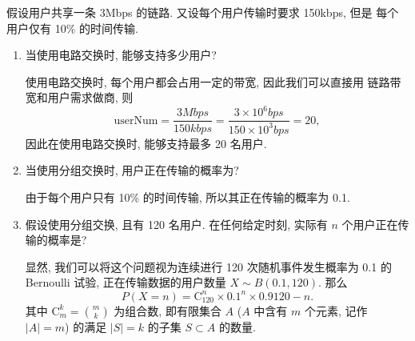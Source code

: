 \documentclass[10pt,UTF8]{ctexbook} %
\begin{document}
\begin{example}
    假设用户共享一条 3Mbps 的链路. 又设每个用户传输时要求 150kbps, 但是
    每个用户仅有 10\% 的时间传输.
    \begin{enumerate}[label={$\left.\mathrm{\alph*}\right)$}, itemsep=0pt]
        \item 当使用电路交换时, 能够支持多少用户?
        \begin{sol}
            使用电路交换时, 每个用户都会占用一定的带宽, 因此我们可以直接用
            链路带宽和用户需求做商, 则
            \[ \mathrm{userNum} = \dfrac{3 \si{Mbps}}{150 \si{kbps}}
            = \dfrac{3 \times 10^6 \si{bps}}{150 \times 10^3 \si{bps}}
            = 20, \]
            因此在使用电路交换时, 能够支持最多 20 名用户.
        \end{sol}
        \item 当使用分组交换时, 用户正在传输的概率为?
        \begin{sol}
            由于每个用户只有 10\% 的时间传输, 所以其正在传输的概率为 0.1.
        \end{sol}
        \item 假设使用分组交换, 且有 120 名用户. 在任何给定时刻, 实际有 $n$
        个用户正在传输的概率是?
        \begin{sol}
            显然, 我们可以将这个问题视为连续进行 120 次随机事件发生概率为 0.1 
            的 Bernoulli 试验,
            正在传输数据的用户数量 $X \sim B(0.1, 120)$. 那么
            \[ P(X = n) = \mathrm{C}_{120}^n \times 0.1^n
            \times 0.9{120-n}. \]
            其中 $\mathrm{C}_m^k = \binom{m}{k}$ 为组合数, 即有限集合 $A$
            ($A$ 中含有 $m$ 个元素, 记作 $|A| = m$)
            的满足 $|S| = k$ 的子集 $S \subset A$ 的数量.
        \end{sol}
    \end{enumerate}
\end{example}
\end{document}
